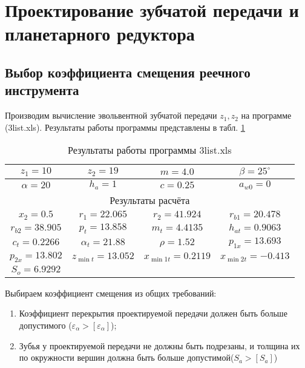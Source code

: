\section{Проектирование зубчатой передачи и планетарного редуктора}

\subsection{Выбор коэффициента смещения реечного инструмента}

Производим вычисление эвольвентной зубчатой передачи $z_1, z_2$ на программе (3list.xls). Результаты работы программы представлены в табл. \ref{table:3list} 

\begin{table}[h]
	
\caption{Результаты работы программы 3list.xls}

\begin{tabular}{|c|c|c|c|}
	\hline 
	$z_1 = 10$ & $z_2 = 19$ & $m = 4.0$ & $\beta = 25^{\circ}$ \\ 
	\hline 
	$\alpha = 20$ & $h_{a} = 1$ & $c = 0.25$ & $a_{w0} = 0$ \\ 
	\hline 
	\multicolumn{4}{|c|}{Результаты расчёта} \\ 
	\hline 
	$x_2 = 0.5$ & $r_{1} = 22.065$ & $r_{2} = 41.924$ & $r_{b1} = 20.478$ \\ 
	\hline 
	$r_{b2} = 38.905$ & $p_t = 13.858$ & $m_t = 4.4135$ & $h_{at} = 0.9063$ \\ 
	\hline 
	$c_t = 0.2266$ & $\alpha_t = 21.88$ & $\rho = 1.52$ & $p_{1x} = 13.693$ \\ 
	\hline 
	$p_{2x} = 13.802$ & $z_{\min t} = 13.052$ & $x_{\min 1t} = 0.2119$ & $x_{\min 2t} = -0.413$ \\ 
	\hline 
	$S_o = 6.9292$ &  &  &  \\ 
	\hline 
\end{tabular}
\label{table:3list}

\end{table}

Выбираем коэффициент смещения из общих требований:

\begin{enumerate}
	\item Коэффициент перекрытия проектируемой передачи должен быть больше допустимого ($ \varepsilon_{\alpha} > [\varepsilon_{\alpha}] $);
	\item Зубья у проектируемой передачи не должны быть подрезаны, и толщина их по окружности вершин должна быть больше допустимой($ S_a > [S_a] $)
\end{enumerate}

